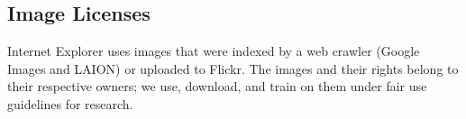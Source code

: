 \subsection{Image Licenses}
Internet Explorer uses images that were indexed by a web crawler (Google Images and LAION) or uploaded to Flickr. The images and their rights belong to their respective owners; we use, download, and train on them under fair use guidelines for research. 





